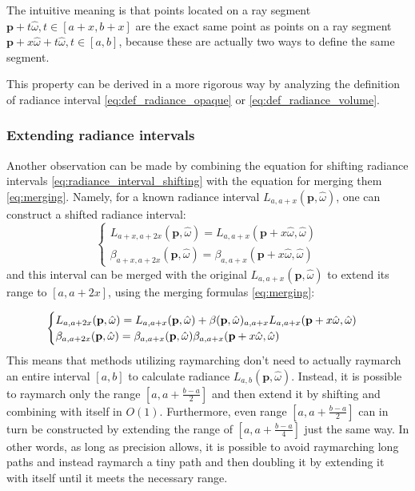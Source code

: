 \documentclass{jcgt}
\begin{document}
The intuitive meaning is that points located on a ray segment $\textbf{p} + t \hat \omega, t \in [a+x,b+x]$ are the exact same point as points on a ray segment $\textbf{p} + x \hat \omega + t \hat \omega, t \in [a,b]$, because these are actually two ways to define the same segment.

This property can be derived in a more rigorous way by analyzing the definition of radiance interval \ref{eq:def_radiance_opaque} or  \ref{eq:def_radiance_volume}.


\subsubsection{Extending radiance intervals}
Another observation can be made by combining the equation for shifting radiance intervals \ref{eq:radiance_interval_shifting} with the equation for merging them \ref{eq:merging}. Namely, for a known radiance interval $L_{a,a+x}(\textbf{p}, \hat \omega)$, one can construct a shifted radiance interval: 
\begin{equation}
  \begin{cases}
    L_{a+x,a+2x}(\textbf{p}, \hat \omega)
      =L_{a,a+x}(\textbf{p}+x\hat \omega, \hat \omega) \\
    \beta_{a+x,a+2x}(\textbf{p}, \hat \omega)
      =\beta_{a,a+x}(\textbf{p}+x\hat \omega, \hat \omega)
  \end{cases}
\end{equation}
and this interval can be merged with the original $L_{a,a+x}(\textbf{p}, \hat \omega)$ to extend its range to $[a,a+2x]$, using the merging formulas \ref{eq:merging}:

\begin{equation}
  \begin{cases}
    L_{a,a+2x}(\textbf{p}, \hat \omega) = L_{a,a+x}(\textbf{p}, \hat \omega) + \beta(\textbf p, \hat \omega)_{a, a+x}L_{a,a+x}(\textbf{p} + x\hat \omega, \hat \omega)\\
    \beta_{a, a+2x}(\textbf p, \hat \omega) = \beta_{a, a+x}(\textbf p, \hat \omega)\beta_{a, a+x}(\textbf p+x\hat \omega, \hat \omega)
    \label{eq:extending_intervals}
  \end{cases}
\end{equation}
This means that methods utilizing raymarching don't need to actually raymarch an entire interval $[a, b]$ to calculate radiance $L_{a,b}(\textbf{p}, \hat \omega)$. Instead, it is possible to raymarch only the range $[a, a + \frac{b-a}{2}]$ and then extend it by shifting and combining with itself in $O(1)$. Furthermore, even range $[a, a+\frac{b-a}{2}]$ can in turn be constructed by extending the range of $[a, a+\frac{b-a}{4}]$ just the same way. In other words, as long as precision allows, it is possible to avoid raymarching long paths and instead raymarch a tiny path and then doubling it by extending it with itself until it meets the necessary range.
\end{document}
